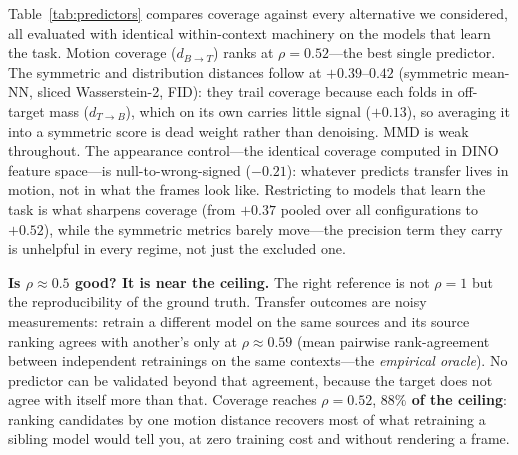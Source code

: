 \documentclass[runningheads]{llncs}
\newcommand{\dtb}{d_{T\to B}}
\newcommand{\dbt}{d_{B\to T}}
\begin{document}
\begin{table}[t]
\centering
\caption{\textbf{Motion coverage is the best predictor of transfer.}
Within-context Spearman $\rho$ between peak transfer and each (negated)
distance, pooled over architectures and configurations; the right column
restricts to the configurations that learn the task (the from-scratch$\times$
semantic regime is excluded, Table~\ref{tab:degenerate}). Motion coverage
(recall, $\dbt$) is the single best predictor ($+0.52$). The symmetric and
distribution distances (symmetric mean-NN, sliced Wasserstein-2, FID) lag
because they fold in off-target mass ($\dtb$), which carries little independent
signal ($+0.13$); MMD is weak throughout; and appearance (DINO) coverage is
null-to-wrong-signed---whatever predicts transfer lives in motion, not in what
the frames look like. Restricting to models that learn the task sharpens
coverage (from $+0.37$) while leaving the symmetric metrics flat: the precision
term they fold in is dead weight.}
\label{tab:predictors}
\small
\setlength{\tabcolsep}{4.5pt}

\end{table}

Table~\ref{tab:predictors} compares coverage against every alternative we
considered, all evaluated with identical within-context machinery on the models
that learn the task. Motion coverage ($\dbt$) ranks at $\rho{=}0.52$---the best
single predictor. The symmetric and distribution distances follow at
$+0.39$--$0.42$ (symmetric mean-NN, sliced Wasserstein-2, FID): they trail
coverage because each folds in off-target mass ($\dtb$), which on its own
carries little signal ($+0.13$), so averaging it into a symmetric score is dead
weight rather than denoising. MMD is weak throughout. The appearance
control---the identical coverage computed in DINO feature space---is
null-to-wrong-signed ($-0.21$): whatever predicts transfer lives in motion, not
in what the frames look like. Restricting to models that learn the task is what
sharpens coverage (from $+0.37$ pooled over all configurations to $+0.52$),
while the symmetric metrics barely move---the precision term they carry is
unhelpful in every regime, not just the excluded one.

\noindent\textbf{Is $\rho{\approx}0.5$ good? It is near the ceiling.}
The right reference is not $\rho{=}1$ but the reproducibility of the ground
truth. Transfer outcomes are noisy measurements: retrain a different model on
the same sources and its source ranking agrees with another's only at
$\rho{\approx}0.59$ (mean pairwise rank-agreement between independent
retrainings on the same contexts---the \emph{empirical oracle}). No predictor
can be validated beyond that agreement, because the target does not agree with
itself more than that. Coverage reaches $\rho{=}0.52$, \textbf{$88\%$ of the
ceiling}: ranking candidates by one motion distance recovers most of what
retraining a sibling model would tell you, at zero training cost and without
rendering a frame.
\end{document}
